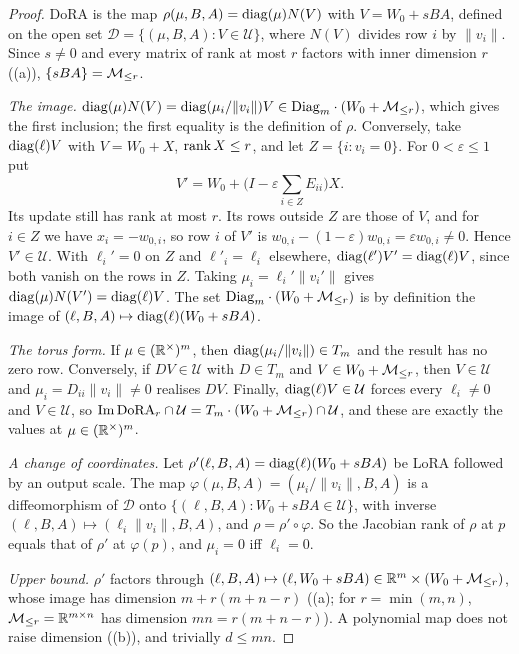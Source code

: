 \begin{proof}
DoRA is the map $\rho(\mu,B,A)=\operatorname{diag}(\mu)N(V)$ with $V=W_0+sBA$, defined on the open set
$\mathcal D=\{(\mu,B,A):V\in\mathcal U\}$, where $N(V)$ divides row $i$ by $\lVert v_i\rVert$. Since $s\ne0$ and every matrix
of rank at most $r$ factors with inner dimension $r$ ((a)), $\{sBA\}=\mathcal{M}_{\le r}$.

\emph{The image.} $\operatorname{diag}(\mu)N(V)=\operatorname{diag}(\mu_i/\lVert v_i\rVert)V\in\mathrm{Diag}_m\cdot(W_0+\mathcal{M}_{\le r})$, which gives the first
inclusion; the first equality is the definition of $\rho$. Conversely, take $\operatorname{diag}(\ell)V$ with $V=W_0+X$, $\operatorname{rank} X\le r$, and
let $Z=\{i:v_i=0\}$. For $0<\varepsilon\le1$ put
\begin{equation*}
  V'=W_0+\Big(I-\varepsilon\sum_{i\in Z}E_{ii}\Big)X .
\end{equation*}
Its update still has rank at most $r$. Its rows outside $Z$ are those of $V$, and for $i\in Z$ we have $x_i=-w_{0,i}$, so
row $i$ of $V'$ is $w_{0,i}-(1-\varepsilon)w_{0,i}=\varepsilon w_{0,i}\ne0$. Hence $V'\in\mathcal U$. With $\ell_i'=0$ on $Z$
and $\ell'_i=\ell_i$ elsewhere, $\operatorname{diag}(\ell')V'=\operatorname{diag}(\ell)V$, since both vanish on the rows in $Z$. Taking
$\mu_i=\ell_i'\lVert v_i'\rVert$ gives $\operatorname{diag}(\mu)N(V')=\operatorname{diag}(\ell)V$. The set $\mathrm{Diag}_m\cdot(W_0+\mathcal{M}_{\le r})$ is by
definition the image of $(\ell,B,A)\mapsto\operatorname{diag}(\ell)(W_0+sBA)$.

\emph{The torus form.} If $\mu\in(\mathbb{R}^\times)^m$, then $\operatorname{diag}(\mu_i/\lVert v_i\rVert)\in T_m$ and the result has no zero
row. Conversely, if $DV\in\mathcal U$ with $D\in T_m$ and $V\in W_0+\mathcal{M}_{\le r}$, then $V\in\mathcal U$ and $\mu_i=D_{ii}\lVert
v_i\rVert\ne0$ realises $DV$. Finally, $\operatorname{diag}(\ell)V\in\mathcal U$ forces every $\ell_i\ne0$ and $V\in\mathcal U$, so
$\operatorname{Im}\mathrm{DoRA}_r\cap\mathcal U=T_m\cdot(W_0+\mathcal{M}_{\le r})\cap\mathcal U$, and these are exactly the values at
$\mu\in(\mathbb{R}^\times)^m$.

\emph{A change of coordinates.} Let $\rho'(\ell,B,A)=\operatorname{diag}(\ell)(W_0+sBA)$ be LoRA followed by an output scale. The map
$\varphi(\mu,B,A)=(\mu_i/\lVert v_i\rVert,B,A)$ is a diffeomorphism of $\mathcal D$ onto
$\{(\ell,B,A):W_0+sBA\in\mathcal U\}$, with inverse $(\ell,B,A)\mapsto(\ell_i\lVert v_i\rVert,B,A)$, and
$\rho=\rho'\circ\varphi$. So the Jacobian rank of $\rho$ at $p$ equals that of $\rho'$ at $\varphi(p)$, and $\mu_i=0$ iff
$\ell_i=0$.

\emph{Upper bound.} $\rho'$ factors through $(\ell,B,A)\mapsto(\ell,W_0+sBA)\in\mathbb{R}^m\times(W_0+\mathcal{M}_{\le r})$, whose image has
dimension $m+r(m+n-r)$ ((a); for $r=\min(m,n)$, $\mathcal{M}_{\le r}=\mathbb{R}^{m\times n}$ has dimension $mn=r(m+n-r)$). A polynomial
map does not raise dimension ((b)), and trivially $d\le mn$.


\end{proof}
